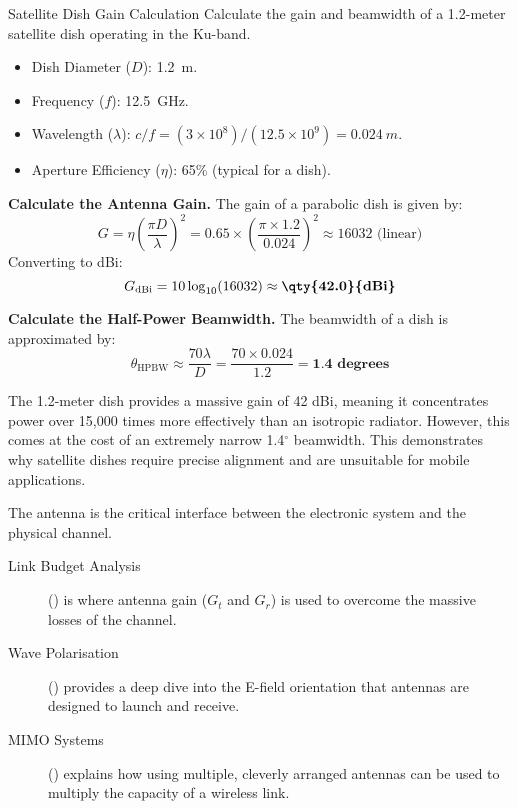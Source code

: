 \begin{workedexample}{Satellite Dish Gain Calculation}
     Calculate the gain and beamwidth of a 1.2-meter satellite dish operating in the Ku-band.
    \begin{itemize}
        \item Dish Diameter ($D$): \qty{1.2}{m}.
        \item Frequency ($f$): \qty{12.5}{GHz}.
        \item Wavelength ($\lambda$): $c/f = (3\times10^8)/(12.5\times10^9) = \qty{0.024}{m}$.
        \item Aperture Efficiency ($\eta$): 65\% (typical for a dish).
    \end{itemize}
    \begin{derivationsteps}
        \step \textbf{Calculate the Antenna Gain.} The gain of a parabolic dish is given by:
        \[ G = \eta \left(\frac{\pi D}{\lambda}\right)^2 = 0.65 \times \left(\frac{\pi \times 1.2}{0.024}\right)^2 \approx 16032 \text{ (linear)} \]
        Converting to dBi:
        \[ G_{\text{dBi}} = 10\log_{10}(16032) \approx \textbf{\qty{42.0}{dBi}} \]
        
        \step \textbf{Calculate the Half-Power Beamwidth.} The beamwidth of a dish is approximated by:
        \[ \theta_{\text{HPBW}} \approx \frac{70 \lambda}{D} = \frac{70 \times 0.024}{1.2} = \textbf{1.4 degrees} \]
    \end{derivationsteps}
     The 1.2-meter dish provides a massive gain of 42 dBi, meaning it concentrates power over 15,000 times more effectively than an isotropic radiator. However, this comes at the cost of an extremely narrow 1.4$^\circ$ beamwidth. This demonstrates why satellite dishes require precise alignment and are unsuitable for mobile applications.
\end{workedexample}


\begin{importantbox}[title={Further Reading}]
    The antenna is the critical interface between the electronic system and the physical channel.
    \begin{description}
        \item[Link Budget Analysis] () is where antenna gain ($G_t$ and $G_r$) is used to overcome the massive losses of the channel.
        \item[Wave Polarisation] () provides a deep dive into the E-field orientation that antennas are designed to launch and receive.
        \item[MIMO Systems] () explains how using multiple, cleverly arranged antennas can be used to multiply the capacity of a wireless link.
    \end{description}
\end{importantbox}